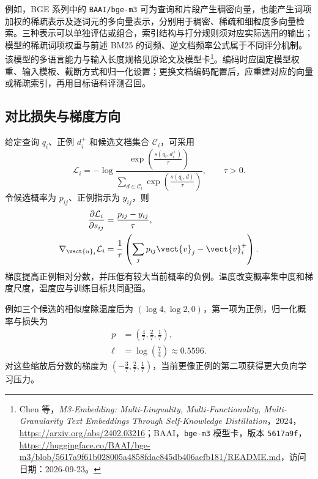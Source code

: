 \documentclass[../textbook.tex]{subfiles}
\begin{document}
例如，BGE 系列中的 \texttt{BAAI/bge-m3} 可为查询和片段产生稠密向量，也能产生词项加权的稀疏表示及逐词元的多向量表示，分别用于稠密、稀疏和细粒度多向量检索。三种表示可以单独评估或组合，索引结构与打分规则须对应实际选用的输出；模型的稀疏词项权重与前述 BM25 的词频、逆文档频率公式属于不同评分机制。该模型的多语言能力与输入长度规格见原论文及模型卡\footnote{Chen 等，\emph{M3-Embedding: Multi-Linguality, Multi-Functionality, Multi-Granularity Text Embeddings Through Self-Knowledge Distillation}，2024，\url{https://arxiv.org/abs/2402.03216}；BAAI，\texttt{bge-m3} 模型卡，版本 \texttt{5617a9f}，\url{https://huggingface.co/BAAI/bge-m3/blob/5617a9f61b028005a4858fdac845db406aefb181/README.md}，访问日期：2026-09-23。}。编码时应固定模型权重、输入模板、截断方式和归一化设置；更换文档编码配置后，应重建对应的向量或稀疏索引，再用目标语料评测召回。

\subsection{对比损失与梯度方向}
给定查询 $q_i$、正例 $d_i^+$ 和候选文档集合 $\mathcal C_i$，可采用
\begin{equation}
\mathcal L_i=-\log\frac{\exp(\frac{s(q_i,d_i^+)}{\tau})}{\sum_{d\in\mathcal C_i}\exp(\frac{s(q_i,d)}{\tau})},\qquad\tau>0.
\label{eq:ir-contrast}
\end{equation}
令候选概率为 $p_{ij}$、正例指示为 $y_{ij}$，则
\begin{equation}
 \begin{aligned}
  \frac{\partial\mathcal L_i}{\partial s_{ij}} &= \frac{p_{ij}-y_{ij}}{\tau}, \\
  \nabla_{\vect{u}_i}\mathcal L_i &= \frac{1}{\tau}\left(\sum_j p_{ij}\vect{v}_j-\vect{v}_i^+\right).
 \end{aligned}
\end{equation}
梯度提高正例相对分数，并压低有较大当前概率的负例。温度改变概率集中度和梯度尺度，温度应与训练目标共同配置。

例如三个候选的相似度除温度后为 $(\log4,\log2,0)$，第一项为正例，归一化概率与损失为
\begin{equation}
 \begin{aligned}
  p &= \left(\frac{4}{7},\frac{2}{7},\frac{1}{7}\right), \\
  \ell &= \log\left(\frac{7}{4}\right)\approx0.5596.
 \end{aligned}
\end{equation}
对这些缩放后分数的梯度为 $(-\frac{3}{7},\frac{2}{7},\frac{1}{7})$，当前更像正例的第二项获得更大负向学习压力。
\end{document}

